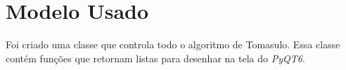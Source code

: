 \section{Modelo Usado}

Foi criado uma classe que controla todo o algoritmo de 
Tomasulo. Essa classe contém funções que retornam listas
para desenhar na tela do \emph{PyQT6}.